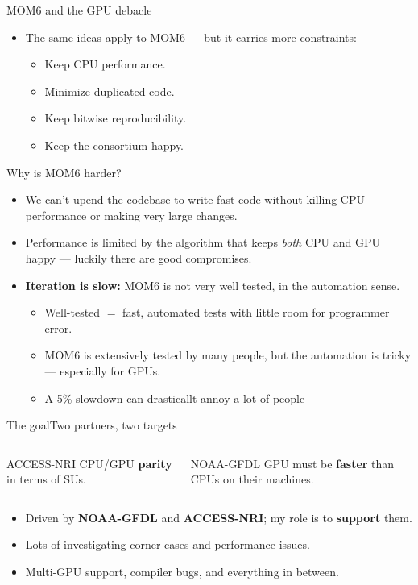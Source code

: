 \documentclass[aspectratio=169]{beamer}
\newcommand{\cplx}[1]{{\footnotesize\color{cookieMuted}#1}}
\begin{document}
\begin{frame}{MOM6 and the GPU debacle}
  \begin{itemize}
    \item The same ideas apply to MOM6 --- but it carries more constraints:
      \begin{itemize}\setlength\itemsep{2pt}
        \item Keep CPU performance.
        \item Minimize duplicated code.
        \item Keep bitwise reproducibility.
        \item Keep the consortium happy.
      \end{itemize}
  \end{itemize}
\end{frame}

\begin{frame}{Why is MOM6 harder?}
  \begin{itemize}
    \item We can't upend the codebase to write fast code without killing CPU performance or making very large changes.
    \item Performance is limited by the algorithm that keeps \emph{both} CPU and GPU happy --- \cplx{luckily there are good compromises}.
    \item \textbf{Iteration is slow:} MOM6 is not very well tested, in the automation sense.
      \begin{itemize}
        \item Well-tested $=$ fast, automated tests with little room for programmer error.
        \item MOM6 is extensively tested by many people, but the automation is tricky --- especially for GPUs.
        \item A 5\% slowdown can drasticallt annoy a lot of people
      \end{itemize}
  \end{itemize}
\end{frame}

\begin{frame}{The goal}{Two partners, two targets}
  \begin{columns}[T,onlytextwidth]
      \begin{block}{ACCESS-NRI}
        CPU/GPU \textbf{parity} in terms of SUs.
      \end{block}
      \begin{block}{NOAA-GFDL}
        GPU must be \textbf{faster} than CPUs on their machines.
      \end{block}
  \end{columns}
    \begin{itemize}\setlength\itemsep{5pt}
    \item Driven by \textbf{NOAA-GFDL} and \textbf{ACCESS-NRI}; my role is to \textbf{support} them.
    \item Lots of investigating corner cases and performance issues.
    \item Multi-GPU support, compiler bugs, and everything in between.
  \end{itemize}
\end{frame}
\end{document}
